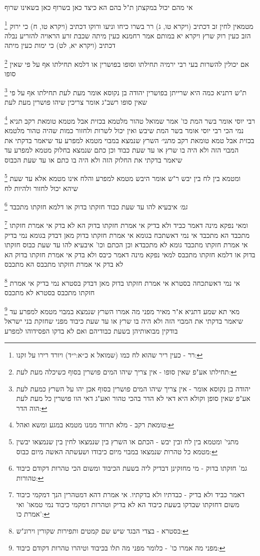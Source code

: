 \documentclass[12pt, openany]{book}
\newcommand{\footnotecomment}[1]{
	\renewcommand\thefootnote{}
	\footnote{#1}}
\newcommand{\commenta}[1]{\footnotecomment{#1}}
\begin{document}
{{אי מהם יכול במקצתן ת"ל בהם הא כיצד כאן בשרוף כאן בשאינו שרוף
\commenta{רר - כעין ריר שהוא לח כמו (שמואל א כ״א:י״ד) ויורד רירו על זקנו:}
מטמאין לחין זב דכתיב (ויקרא טו, ג) רר בשרו כיחו וניעו ורוקו דכתיב (ויקרא טו, ח) כי ירוק הזב כעין רוק 
שרץ {ויקרא יא } במותם אמר רחמנא כעין מיתה שכבת זרע הראויה להזריע נבלה דכתיב (ויקרא יא, לט) כי ימות כעין מיתה
\commenta{תחילתו אע"פ שאין סופו - אין צריך שיהו המים פושרין בסוף כשיכלה מעת לעת:}
אם יכולין להשרות בעי רבי ירמיה תחילתו וסופו בפושרין או דלמא תחילתו אף על פי שאין סופו 
\commenta{יהודה בן נקוסא אומר - אין צריך שיהו המים פושרין בסוף אכן יהו על השרץ כמעת לעת אע"פ שאין סופן וקולא היא דאי לא הדר בהכי טהור ואע"ג דאי הוו פושרין כל מעת לעת הוה הדר:}
ת"ש דתניא כמה היא שרייתן בפושרין יהודה בן נקוסא אומר מעת לעת תחילתו אף על פי שאין סופו רשב"ג אומר צריכין שיהו פושרין מעת לעת
\commenta{טומאת רקב - מלא תרווד ממנו מטמא במגע ומשא ואהל:}
רבי יוסי אומר בשר המת כו' אמר שמואל טהור מלטמא בכזית אבל מטמא טומאת רקב תניא נמי הכי רבי יוסי אומר בשר המת שיבש ואין יכול לשרות ולחזור כמות שהיה טהור מלטמא בכזית אבל טמא טומאת רקב
{\large\emph{מתני׳}} השרץ שנמצא במבוי מטמא למפרע עד שיאמר בדקתי את המבוי הזה ולא היה בו שרץ או עד שעת כבוד
וכן כתם שנמצא בחלוק מטמא למפרע עד שיאמר בדקתי את החלוק הזה ולא היה בו כתם או עד שעת הכבוס 
\commenta{מתני' ומטמא בין לח ובין יבש - הכתם או השרץ בין שנמצאו לחין בין שנמצאו יבשין מטמא כל טהרות שנמצאו במבוי מיום כיבודו ושעשתה האשה מיום כבוס:}
ומטמא בין לח בין יבש ר"ש אומר היבש מטמא למפרע והלח אינו מטמא אלא עד שעת שיהא יכול לחזור ולהיות לח
\commenta{גמ' חזקתו בדוק - מי מחזקינן דבדיק ליה בשעת הכיבוד ומשום הכי טהרות דקודם כיבוד טהורות:}
{\large\emph{גמ׳}} איבעיא להו עד שעת כבוד חזקתו בדוק או דלמא חזקתו מתכבד 
\commenta{דאמר כביד ולא בדיק - כבדתיו ולא בדקתיו. אי אמרת דהא דמטהרין הנך דמקמי כיבוד משום דחזקתו שבדקו בשעת כיבוד הא לא בדיק וטהרות דמקמי כיבוד נמי טמאו' ואי אמרת כו':}
ומאי נפקא מינה דאמר כביד ולא בדיק אי אמרת חזקתו בדוק הא לא בדק אי אמרת חזקתו מתכבד הא מתכבד
אי נמי דאשתכח בגומא אי אמרת חזקתו בדוק מאן דבדק בגומא נמי בדיק אי אמרת חזקתו מתכבד גומא לא מתכבדא
וכן הכתם וכו' איבעיא להו עד שעת כבוס חזקתו בדוק או דלמא חזקתו מתכבס 
למאי נפקא מינה דאמר כיבס ולא בדק אי אמרת חזקתו בדוק הא לא בדק אי אמרת חזקתו מתכבס הא מתכבס 
\commenta{בסטרא - בצדי הבגד שיש שם קמטים ותפירות שקורין וירונ"ש:}
אי נמי דאשתכחה בסטרא אי אמרת חזקתו בדוק מאן דבדק בסטרא נמי בדיק אי אמרת חזקתו מתכבס בסטרא לא מתכבס 
\commenta{מפני מה אמרו כו' - כלומר מפני מה תלו בכיבוד וטיהרו טהרות דקודם כיבוד:}
מאי תא שמע דתניא א"ר מאיר מפני מה אמרו השרץ שנמצא במבוי מטמא למפרע עד שיאמר בדקתי את המבוי הזה ולא היה בו שרץ או עד שעת כיבוד מפני שחזקת בני ישראל בודקין מבואותיהן בשעת כבודיהם ואם לא בדקו הפסידוהו למפרע 
}}
\end{document}
